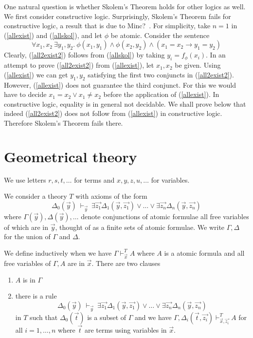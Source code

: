 \documentclass[10pt,a4paper]{article}
\begin{document}
One natural question is whether Skolem's Theorem holds for other logics as well.
We first consider constructive logic. Surprisingly, Skolem's Theorem fails
for constructive logic, a result that is due to Minc?~\cite{xxx}.
For simplicity, take $n=1$ in (\ref{allexist}) and (\ref{allskol}),
and let $\phi$ be atomic. Consider the sentence
\begin{equation}\label{all2exist2}
\forall x_1,x_2~\exists y_1,y_2.~\phi(x_1,y_1) \land \phi(x_2,y_2) \land (x_1 = x_2 \to y_1 = y_2)
\end{equation}
Clearly,  (\ref{all2exist2}) follows from (\ref{allskol}) by taking $y_i = f_\phi(x_i)$.
In an attempt to prove (\ref{all2exist2}) from (\ref{allexist}), let $x_1,x_2$ be given.
Using (\ref{allexist}) we can get $y_1,y_2$ satisfying the first two conjuncts
in (\ref{all2exist2}). However, (\ref{allexist}) does not guarantee the third conjunct.
For this we would have to decide $ x_1 = x_2 \lor x_1 \neq x_2$ before the
application of (\ref{allexist}). In constructive logic, equality is in general not decidable.
We shall prove below that indeed (\ref{all2exist2}) does not follow from  (\ref{allexist})
in constructive logic.
Therefore Skolem's Theorem fails there.


\section{Geometrical theory}
 
 We use letters $r,s,t,\dots$ for terms and $x,y,z,u,\dots$ for variables.

\medskip

 We consider a theory $T$ with axioms of the form
$$
\Delta_0(\vec{y})~\vdash_{\vec{y}}~
\exists \vec{z_1}\Delta_1(\vec{y},\vec{z_1})\vee\dots\vee\exists \vec{z_n}\Delta_n(\vec{y},\vec{z_n})
$$
where $\Gamma(\vec{y}), \Delta(\vec{y}),\dots$ denote conjunctions of atomic formulae
all free variables of which are in $\vec{y}$, thought of as a finite sets of atomic formulae.
We write $\Gamma,\Delta$ for the union of $\Gamma$ and $\Delta$.

 We define inductively when we have $\Gamma\vdash_{\vec{x}}^T A$ where $A$ is a atomic formula
and all free variables of $\Gamma,A$ are in $\vec{x}$. There are two clauses

\begin{enumerate}
\item $A$ is in $\Gamma$

\item there is a rule
$$
\Delta_0(\vec{y})~\vdash_{\vec{y}}~
\exists \vec{z_1}\Delta_1(\vec{y},\vec{z_1})\vee\dots\vee\exists \vec{z_n}\Delta_n(\vec{y},\vec{z_n})
$$
in $T$ such that $\Delta_0(\vec{t})$ is a subset of $\Gamma$ and
we have $\Gamma,\Delta_i(\vec{t},\vec{z_i})\vdash^T_{\vec{x},\vec{z_i}} A$ for all $i = 1,\dots,n$
where $\vec{t}$ are terms using variables in $\vec{x}$.
\end{enumerate}
\end{document}
